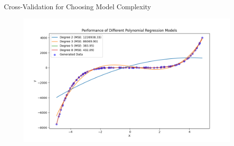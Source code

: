 \documentclass[serif, aspectratio=169]{beamer}
\begin{document}
\begin{frame}{Cross-Validation for Choosing Model Complexity}
    \begin{figure}
        \centering
        \includegraphics[width=0.8\linewidth]{pic/Figure_16.png}
    \end{figure}
\end{frame}



\begin{frame}[allowframebreaks]
    
    
    \nocite{*} %
\end{frame}
\end{document}

